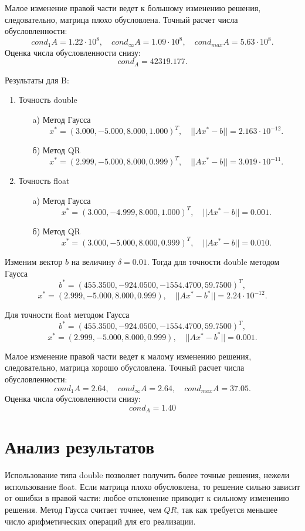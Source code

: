 \documentclass[12pt, a4paper]{article}
\begin{document}
Малое изменение правой части ведет к большому изменению решения, следовательно, матрица плохо обусловлена. Точный расчет числа обусловленности: 
$$cond_1A = 1{.}22\cdot10^8,\quad cond_{\infty}A = 1{.}09\cdot10^8, \quad cond_{max}A = 5{.}63\cdot10^8 .$$ 
Оценка числа обусловленности снизу:
$$cond_A = 42319{.}177.$$

Результаты для B:
\begin{enumerate}
\item Точность double
	\begin{enumerate}
	\item[a)] Метод Гаусса
	$$x^* = (3{.}000 , -5{.}000, 8{.}000 ,1{.}000)^{T},\quad ||Ax^{*}-b|| = 2{.}163\cdot10^{-12}.$$
	\item[б)] Метод QR
	$$x^* = (2{.}999 , -5{.}000, 8{.}000 ,0{.}999)^{T},\quad ||Ax^{*}-b|| = 3{.}019\cdot10^{-11}.$$
	\end{enumerate}
\item Точность float
	\begin{enumerate}
	\item[a)] Метод Гаусса
	$$x^* = (3{.}000 , -4{.}999, 8{.}000, 1{.}000)^{T},\quad ||Ax^{*}-b|| = 0{.}001.$$
	\item[б)] Метод QR
	$$x^* = (3{.}000 , -5{.}000, 8{.}000, 0{.}999)^{T},\quad ||Ax^{*}-b|| = 0{.}010.$$
	\end{enumerate}
\end{enumerate}
Изменим вектор $b$ на величину $\delta = 0.01$. Тогда для точности double методом Гаусса
$$b^* = (455.3500, -924{.}0500, -1554{.}4700, 59{.}7500)^T,$$
$$x^* = (2{.}999, -5{.}000, 8{.}000, 0{.}999), \quad ||Ax^{*}-b^*|| =  2{.}24\cdot10^{-12}.$$

Для точности float методом Гаусса
$$b^* = (455.3500, -924{.}0500, -1554{.}4700, 59{.}7500)^T,$$
$$x^* = (2{.}999, -5{.}000, 8{.}000, 0{.}999), \quad ||Ax^{*}-b^*|| =  0{.}001.$$

Малое изменение правой части ведет к малому изменению решения, следовательно, матрица хорошо обусловлена. Точный расчет числа обусловленности: 
$$cond_1A = 2{.}64,\quad cond_{\infty}A = 2{.}64, \quad cond_{max}A = 37{.}05.$$
Оценка числа обусловленности снизу:
$$cond_A = 1{.}40$$
\newpage

\section{Анализ результатов}
Использование типа double позволяет получить более точные решения,
нежели использование float. Если матрица плохо обусловлена, то решение сильно зависит от ошибки в правой части: любое отклонение приводит к сильному изменению решения. Метод Гаусса считает точнее, чем $QR$, так как требуется меньшее число арифметических операций для его реализации.
\end{document}
